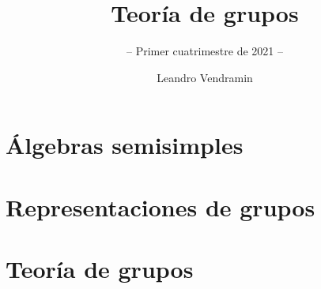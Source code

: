 \documentclass[graybox,envcountsect]{svmono}
\begin{document}
\lstset{language=GAP,
  showstringspaces=false,
  xleftmargin=0.0cm,
  xrightmargin=0.0cm,
  basicstyle=\small\ttfamily,
  frame=single,
  framerule=0pt,
}

\renewcommand{\thesection}{\arabic{chapter}} 

\author{Leandro Vendramin}
\title{Teoría de grupos}
\subtitle{-- Primer cuatrimestre de 2021 --}
\maketitle

\frontmatter

%
%

%

\tableofcontents

%

\mainmatter

\part{Álgebras semisimples}




\part{Representaciones de grupos}














\part{Teoría de grupos}


















\backmatter
%





\printindex
\end{document}

